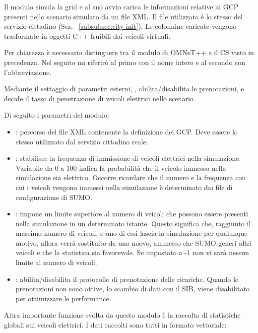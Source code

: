 Il modulo simula la grid e al suo avvio carica le informazioni relative ai GCP presenti nello scenario simulato da un file XML. Il file utilizzato è lo stesso del servizio cittadino (Sez. ~\ref{subsubsec:city-init}). Le colonnine caricate vengono trasformate in oggetti C++ fruibili dai veicoli virtuali.

Per chiarezza è necessario distinguere tra il modulo   di OMNeT++ e il CS visto in precedenza. Nel seguito mi riferirò al primo con il nome intero e al secondo con l'abbreviazione.

Mediante il settaggio di parametri esterni, , abilita/disabilita le prenotazioni, e decide il tasso di penetrazione di veicoli elettrici nello scenario.

Di seguito i parametri del modulo:

\begin{itemize}
	\item {}: percorso del file XML contenente la definizione dei GCP. Deve essere lo stesso utilizzato dal servizio cittadino reale.
	\item {}: stabilisce la frequenza di immissione di veicoli elettrici nella simulazione. Variabile da 0 a 100 indica la probabilità che il veicolo immesso nella simulazione sia elettrico. Occorre ricordare che il numero e la frequenza con cui i veicoli vengono immessi nella simulazione è determinato dai file di configurazione di SUMO. 
	\item {}: impone un limite superiore al numero di veicoli che possono essere presenti nella simulazione in un determinato istante. Questo significa che, raggiunto il massimo numero di veicoli, e uno di essi lascia la simulazione per qualunque motivo, allora verrà sostituito da uno nuovo, ammesso che SUMO generi altri veicoli e che la statistica sia favorevole. Se impostato a -1 non vi sarà nessun limite al numero di veicoli.
	\item {}: abilita/disabilita il protocollo di prenotazione delle ricariche. Quando le prenotazioni non sono attive, lo scambio di dati con il SIB, viene disabilitato per ottimizzare le performance.
\end{itemize}

\noindent
Altra importante funzione svolta da questo modulo è la raccolta di statistiche globali sui veicoli elettrici. I dati raccolti sono tutti in formato vettoriale:

